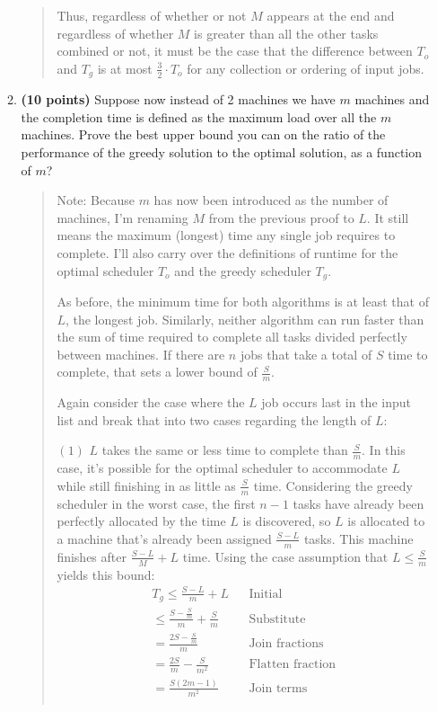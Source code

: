 \documentclass[11pt]{article}
\begin{document}
\begin{enumerate}
\begin{enumerate}
\begin{quote}
\begin{itemize}
\end{itemize}
Thus, regardless of whether or not $M$ appears at the end and regardless of whether $M$ is greater than all the other tasks combined or not, it must be the case that the difference between $T_o$ and $T_g$ is at most $\frac{3}{2} \cdot T_o$ for any collection or ordering of input jobs. 
\end{quote}
\item
{\bf (10 points)} 
Suppose now instead of 2 machines we have $m$ machines and the completion time is defined as the maximum load over all the $m$ machines.  
Prove the best upper bound you can on the ratio of the 
performance of the greedy solution to the optimal solution, as a
function of $m$? 
\begin{quote}
  \color{purple}
Note: Because $m$ has now been introduced as the number of machines, I'm renaming $M$ from the previous proof to $L$. It still means the maximum (longest) time any single job requires to complete. I'll also carry over the definitions of runtime for the optimal scheduler $T_o$ and the greedy scheduler $T_g$. 

\medskip
As before, the minimum time for both algorithms is at least that of $L$, the longest job. Similarly, neither algorithm can run faster than the sum of time required to complete all tasks divided perfectly between machines. If there are $n$ jobs that take a total of $S$ time to complete, that sets a lower bound of $\frac{S}{m}$. 

\medskip
Again consider the case where the $L$ job occurs last in the input list and break that into two cases regarding the length of $L$:

\medskip
$(1)$ $L$ takes the same or less time to complete than $\frac{S}{m}$. In this case, it's possible for the optimal scheduler to accommodate $L$ while still finishing in as little as $\frac{S}{m}$ time. Considering the greedy scheduler in the worst case, the first $n - 1$ tasks have already been perfectly allocated by the time $L$ is discovered, so $L$ is allocated to a machine that's already been assigned $\frac{S - L}{m}$ tasks. This machine finishes after $\frac{S - L}{M} + L$ time. Using the case assumption that $L \leq \frac{S}{m}$ yields this bound:
  \begin{align*}
      && T_g \leq \frac{S - L}{m} + L && \text{Initial} && \\
      && \leq \frac{S - \frac{S}{m}}{m} + \frac{S}{m} && \text{Substitute} && \\
      && = \frac{2S - \frac{S}{m}}{m} && \text{Join fractions} && \\
      && = \frac{2S}{m} - \frac{S}{m^2} && \text{Flatten fraction} && \\
      && = \frac{S(2m - 1)}{m^2}  && \text{Join terms} && \\
  \end{align*} 


\end{quote}
\end{enumerate}
\end{enumerate}
\end{document}
